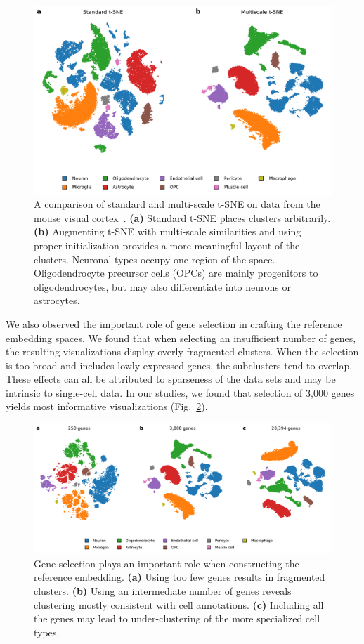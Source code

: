 \documentclass[runningheads]{llncs}
\begin{document}
\begin{figure}[htbp]
  \includegraphics[width=\textwidth]{figures/hrvatin_multiscale_tsne.pdf}
  \caption{A comparison of standard and multi-scale t-SNE on data from the
  mouse visual cortex~\cite{hrvatin2018}. {\bf (a)} Standard t-SNE places
  clusters arbitrarily. {\bf (b)} Augmenting t-SNE with multi-scale
  similarities and using proper initialization provides a more meaningful
  layout of the clusters. Neuronal types occupy one region of the space.
  Oligodendrocyte precursor cells (OPCs) are mainly progenitors to
  oligodendrocytes, but may also differentiate into neurons or astrocytes.}
  \label{fig:multiscale}
\end{figure}

We also observed the important role of gene selection in crafting the reference
embedding spaces. We found that when selecting an insufficient number of genes,
the resulting visualizations display overly-fragmented clusters. When the
selection is too broad and includes lowly expressed genes, the subclusters tend
to overlap. These effects can all be attributed to sparseness of the data sets
and may be intrinsic to single-cell data. In our studies, we found that
selection of 3,000 genes yields most informative visualizations
(Fig.~\ref{fig:gene_selection}).

\begin{figure}[htbp]
  \includegraphics[width=\textwidth]{figures/hrvatin_embedding_tsne_genes.pdf}
  \caption{Gene selection plays an important role when constructing the
  reference embedding. {\bf (a)} Using too few genes results in fragmented
  clusters. {\bf (b)} Using an intermediate number of genes reveals clustering
  mostly consistent with cell annotations. {\bf (c)} Including all the genes
  may lead to under-clustering of the more specialized cell types.}
  \label{fig:gene_selection}
\end{figure}
\end{document}
